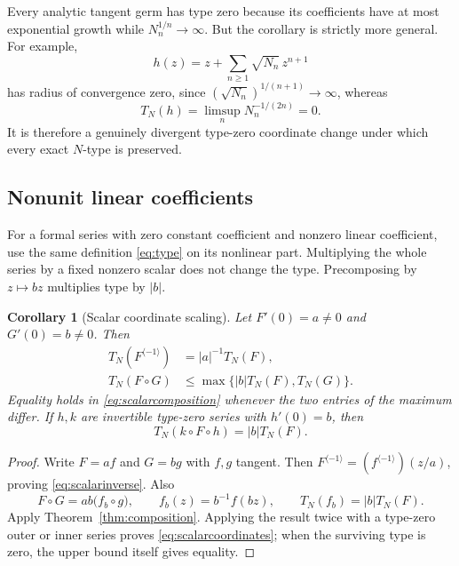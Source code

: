 \documentclass[11pt,a4paper]{article}
\numberwithin{equation}{section}
\newtheorem{corollary}[theorem]{Corollary}
\theoremstyle{definition}
\theoremstyle{remark}
\newcommand{\Type}{T_N}
\newcommand{\inv}[1]{#1^{\langle-1\rangle}}
\begin{document}
Every analytic tangent germ has type zero because its coefficients have
at most exponential growth while $N_n^{1/n}\to\infty$. But the
corollary is strictly more general. For example,
\begin{equation}
 h(z)=z+\sum_{n\ge1}\sqrt{N_n}\,z^{n+1}
 \label{eq:divergentzero}
\end{equation}
has radius of convergence zero, since
$(\sqrt{N_n})^{1/(n+1)}\to\infty$, whereas
\[
 \Type(h)=\limsup_n N_n^{-1/(2n)}=0.
\]
It is therefore a genuinely divergent type-zero coordinate change under
which every exact $N$-type is preserved.

\subsection{Nonunit linear coefficients}

For a formal series with zero constant coefficient and nonzero linear
coefficient, use the same definition \eqref{eq:type} on its nonlinear
part. Multiplying the whole series by a fixed nonzero scalar does not
change the type. Precomposing by $z\mapsto bz$ multiplies type by $|b|$.

\begin{corollary}[Scalar coordinate scaling]
\label{cor:scalarscaling}
Let $F'(0)=a\ne0$ and $G'(0)=b\ne0$. Then
\begin{align}
 \Type(\inv F)&=|a|^{-1}\Type(F),\label{eq:scalarinverse}\\
 \Type(F\circ G)&\le
       \max\{|b|\Type(F),\Type(G)\}.
       \label{eq:scalarcomposition}
\end{align}
Equality holds in \eqref{eq:scalarcomposition} whenever the two entries
of the maximum differ. If $h,k$ are invertible type-zero series with
$h'(0)=b$, then
\begin{equation}
 \Type(k\circ F\circ h)=|b|\Type(F).
 \label{eq:scalarcoordinates}
\end{equation}
\end{corollary}
\begin{proof}
Write $F=af$ and $G=bg$ with $f,g$ tangent. Then
$\inv F=(\inv f)(z/a)$, proving \eqref{eq:scalarinverse}. Also
\[
 F\circ G=ab\bigl(f_b\circ g\bigr),\qquad
 f_b(z)=b^{-1}f(bz),\qquad \Type(f_b)=|b|\Type(F).
\]
Apply Theorem~\ref{thm:composition}. Applying the result twice with a
type-zero outer or inner series proves \eqref{eq:scalarcoordinates};
when the surviving type is zero, the upper bound itself gives equality.
\end{proof}
\end{document}

